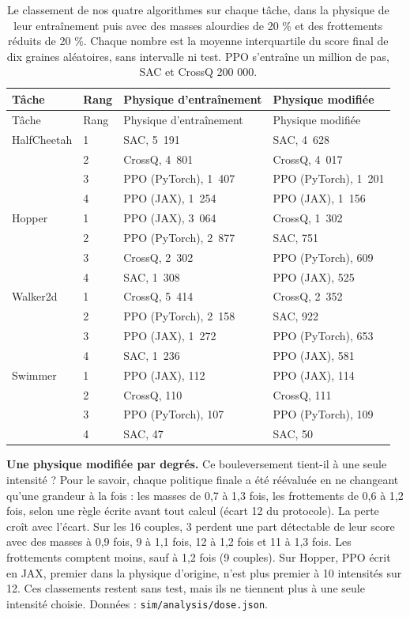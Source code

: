 \documentclass[11pt,a4paper]{article}
\begin{document}
\begin{longtable}[]{@{}llll@{}}
\caption{Le classement de nos quatre algorithmes sur chaque tâche, dans
la physique de leur entraînement puis avec des masses alourdies de 20 \%
et des frottements réduits de 20 \%. Chaque nombre est la moyenne
interquartile du score final de dix graines aléatoires, sans intervalle
ni test. PPO s'entraîne un million de pas, SAC et CrossQ 200
000.}\tabularnewline
\toprule\noalign{}
Tâche & Rang & Physique d'entraînement & Physique modifiée \\
\midrule\noalign{}
\endfirsthead
\toprule\noalign{}
Tâche & Rang & Physique d'entraînement & Physique modifiée \\
\midrule\noalign{}
\endhead
\bottomrule\noalign{}
\endlastfoot
HalfCheetah & 1 & SAC, 5~191 & SAC, 4~628 \\
& 2 & CrossQ, 4~801 & CrossQ, 4~017 \\
& 3 & PPO (PyTorch), 1~407 & PPO (PyTorch), 1~201 \\
& 4 & PPO (JAX), 1~254 & PPO (JAX), 1~156 \\
Hopper & 1 & PPO (JAX), 3~064 & CrossQ, 1~302 \\
& 2 & PPO (PyTorch), 2~877 & SAC, 751 \\
& 3 & CrossQ, 2~302 & PPO (PyTorch), 609 \\
& 4 & SAC, 1~308 & PPO (JAX), 525 \\
Walker2d & 1 & CrossQ, 5~414 & CrossQ, 2~352 \\
& 2 & PPO (PyTorch), 2~158 & SAC, 922 \\
& 3 & PPO (JAX), 1~272 & PPO (PyTorch), 653 \\
& 4 & SAC, 1~236 & PPO (JAX), 581 \\
Swimmer & 1 & PPO (JAX), 112 & PPO (JAX), 114 \\
& 2 & CrossQ, 110 & CrossQ, 111 \\
& 3 & PPO (PyTorch), 107 & PPO (PyTorch), 109 \\
& 4 & SAC, 47 & SAC, 50 \\
\end{longtable}

\textbf{Une physique modifiée par degrés.} Ce bouleversement tient-il à
une seule intensité ? Pour le savoir, chaque politique finale a été
réévaluée en ne changeant qu'une grandeur à la fois : les masses de 0,7
à 1,3 fois, les frottements de 0,6 à 1,2 fois, selon une règle écrite
avant tout calcul (écart 12 du protocole). La perte croît avec l'écart.
Sur les 16 couples, 3 perdent une part détectable de leur score avec des
masses à 0,9 fois, 9 à 1,1 fois, 12 à 1,2 fois et 11 à 1,3 fois. Les
frottements comptent moins, sauf à 1,2 fois (9 couples). Sur Hopper, PPO
écrit en JAX, premier dans la physique d'origine, n'est plus premier à
10 intensités sur 12. Ces classements restent sans test, mais ils ne
tiennent plus à une seule intensité choisie. Données :
\texttt{sim/analysis/dose.json}.
\end{document}
